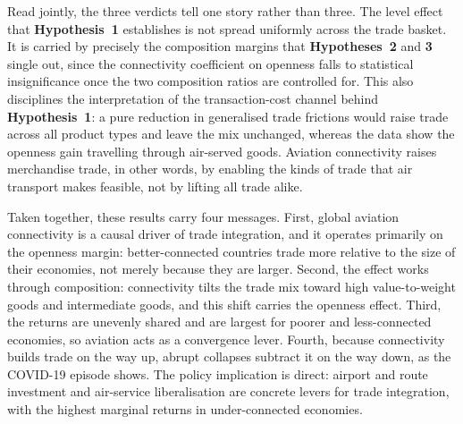 Read jointly, the three verdicts tell one story rather than three. The level effect that \textbf{Hypothesis~1} establishes is not spread uniformly across the trade basket. It is carried by precisely the composition margins that \textbf{Hypotheses~2} and \textbf{3} single out, since the connectivity coefficient on openness falls to statistical insignificance once the two composition ratios are controlled for. This also disciplines the interpretation of the transaction-cost channel behind \textbf{Hypothesis~1}: a pure reduction in generalised trade frictions would raise trade across all product types and leave the mix unchanged, whereas the data show the openness gain travelling through
air-served goods. Aviation connectivity raises merchandise trade, in other words, by enabling the kinds of trade that air transport makes feasible, not by lifting all trade alike.

Taken together, these results carry four messages. First, global aviation connectivity is a causal driver of trade integration, and it operates primarily on the openness margin: better-connected countries trade more relative to the size of their economies, not merely because they are larger. Second, the effect works through composition: connectivity tilts the trade mix toward high value-to-weight goods and intermediate goods, and this shift carries the openness effect. Third, the returns are unevenly shared and are largest for poorer and less-connected economies, so aviation acts as a convergence lever. Fourth, because connectivity builds trade on the way up, abrupt collapses subtract it on the way down, as the COVID-19 episode shows. The policy implication is direct: airport and route investment and air-service liberalisation are concrete levers for trade integration, with the highest marginal returns in under-connected economies.


